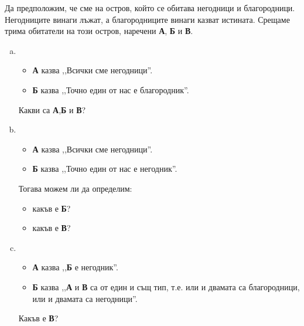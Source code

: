 \begin{problem}
  Да предположим, че сме на остров, който се обитава негодници и благородници.
  Негодниците винаги лъжат, а благородниците винаги казват истината.
  Срещаме трима обитатели на този остров, наречени {\bf А}, {\bf Б} и {\bf В}.
  \begin{enumerate}[a)]
  \item
    \begin{itemize}
    \item
      {\bf А} казва ,,Всички сме негодници''.
    \item
      {\bf Б} казва ,,Точно един от нас е благородник''.
    \end{itemize}
      Какви са {\bf А},{\bf Б} и {\bf В}?
  \item
    \begin{itemize}
    \item
      {\bf А} казва ,,Всички сме негодници''.
    \item
      {\bf Б} казва ,,Точно един от нас е негодник''.
    \end{itemize}
    Тогава можем ли да определим:
    \begin{itemize}
    \item
      какъв е {\bf Б}?
    \item
      какъв е {\bf В}?
    \end{itemize}
  \item
    \begin{itemize}
    \item
      {\bf А} казва ,,{\bf Б} е негодник''.
    \item
      {\bf Б} казва ,,{\bf А} и {\bf В} са от един и същ тип, т.е. или и двамата са благородници, или и двамата са негодници''.
    \end{itemize}
    Какъв е {\bf В}?
  \end{enumerate}
\end{problem}
